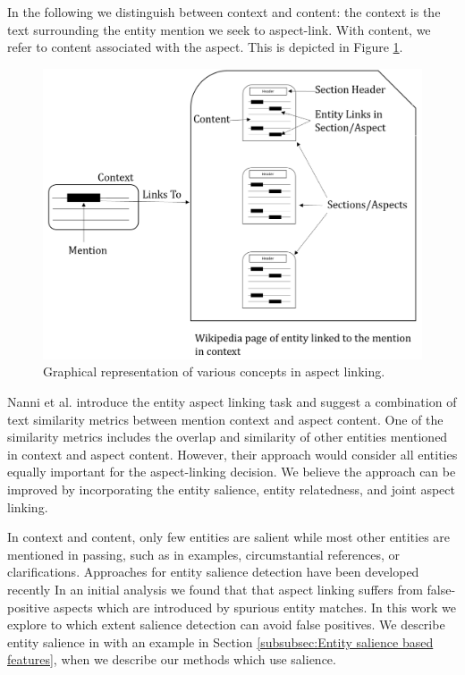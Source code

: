 In the following we distinguish between context and content: the context is the text surrounding the entity mention we seek to aspect-link. With content, we refer to content associated with the aspect. This is depicted in Figure \ref{fig:context-vs-content}.

\begin{figure}
    \centering
    \includegraphics [scale=0.6]{context-and-content.png}
    \caption{Graphical representation of various concepts in aspect linking.}
    \label{fig:context-vs-content}
\end{figure}

Nanni et al. \cite{nanni2018entity} introduce the entity aspect linking task and suggest a combination of text similarity metrics between mention context and aspect content. One of the similarity metrics includes the overlap and similarity of other entities mentioned in context and aspect content. However, their approach would consider all entities equally important for the aspect-linking decision. We believe the approach can be improved by incorporating the entity salience, entity relatedness, and joint aspect linking.  

In context and content, only few entities are salient while most other entities are mentioned in passing, such as in examples, circumstantial references, or clarifications. Approaches for entity salience detection have been developed  recently \cite{dunietz-gillick-2014-new, xiong2018towards, swat} %
 In an initial analysis we found that that aspect linking suffers from false-positive aspects which are introduced by spurious entity matches. In this work we explore to which extent salience detection can avoid false positives. We describe entity salience in with an example in Section \ref{subsubsec:Entity salience based features}, when we describe our methods which use salience.

